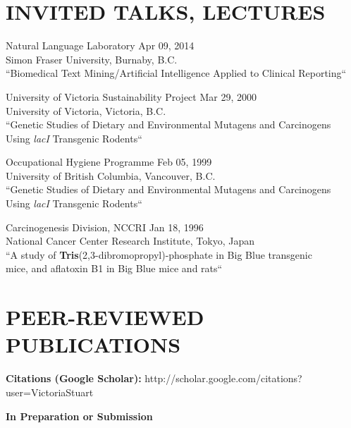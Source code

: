 \documentclass[margin]{res} %
\begin{document}
\begin{resume}
{\color{blue}\section{INVITED TALKS, LECTURES}}

Natural Language Laboratory \hfill Apr 09, 2014\\
Simon Fraser University, Burnaby, B.C.\\
``Biomedical Text Mining/Artificial Intelligence Applied to Clinical Reporting``

University of Victoria Sustainability Project \hfill Mar 29, 2000\\
University of Victoria, Victoria, B.C.\\
``Genetic Studies of Dietary and Environmental Mutagens and Carcinogens \\
\-\hspace{0.4 cm}Using \textit{lacI} Transgenic Rodents``

Occupational Hygiene Programme \hfill Feb 05, 1999\\
University of British Columbia, Vancouver, B.C.\\
``Genetic Studies of Dietary and Environmental Mutagens and Carcinogens \\
\-\hspace{0.4 cm}Using \textit{lacI} Transgenic Rodents``

Carcinogenesis Division, NCCRI \hfill Jan 18, 1996\\
National Cancer Center Research Institute, Tokyo, Japan\\
``A study of \textbf{Tris}(2,3-dibromopropyl)-phosphate in Big Blue\textsuperscript{\textregistered} transgenic\\
\-\hspace{0.4 cm}mice, and aflatoxin B1 in Big  Blue\textsuperscript{\textregistered} mice and rats``


{\color{blue}\section{PEER-REVIEWED PUBLICATIONS}}

\textbf{Citations (Google Scholar):} http://scholar.google.com/citations?user=VictoriaStuart

\textbf{In Preparation or Submission}


\end{resume}
\end{document}

